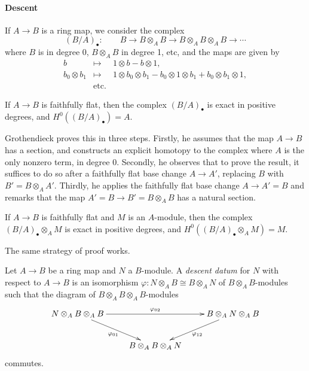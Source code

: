 \paragraph{Descent}
If $A \to B$ is a ring map, we consider the complex
$$
(B/A)_\bullet : \qquad B \to B\otimes_A B \to B\otimes_A B \otimes_A B \to \cdots
$$
where $B$ is in degree 0, $B\otimes_A B$ in degree 1, etc, and the maps are given by 
\begin{eqnarray*}
b & \mapsto  & 1 \otimes b - b \otimes 1, \\
b_0 \otimes b_1 &  \mapsto & 1 \otimes b_0 \otimes b_1 - b_0 \otimes 1 \otimes b_1 + b_0 \otimes b_1 \otimes 1, \\
& \text{etc.}
\end{eqnarray*}

\begin{lemma}
If $A \to B$ is faithfully flat, then the complex $(B/A)_\bullet$ is exact in positive degrees, and $H^0((B/A)_\bullet) = A$.
\end{lemma}

Grothendieck proves this in three steps. Firstly, he assumes that the map $A \to B$ has a section, and constructs an explicit homotopy to the complex where $A$ is the only nonzero term, in degree 0. Secondly, he observes that to prove the result, it suffices to do so after a faithfully flat base change $A \to A'$,  replacing $B$ with $B' = B \otimes_A A'$. Thirdly, he applies the faithfully flat base change $A \to A' =B$ and remarks that the map $A' = B \to B' = B\otimes_A B$ has a natural section.

\begin{lemma} \label{lem:descentForModules}
If $A \to B$ is faithfully flat and $M$ is an $A$-module, then the
complex $(B/A)_\bullet \otimes_A M$ is exact in positive degrees, and $H^0((B/A)_\bullet \otimes_A M) = M$.
\end{lemma}

The same strategy of proof works.

\begin{definition}
Let $A \to B$ be a ring map and $N$ a $B$-module. A \emph{descent datum} for $N$ with respect to $A \to B$ is an isomorphism $\varphi: N\otimes_A B \cong B\otimes_A N$ of $B\otimes_A B$-modules such that the diagram of $B\otimes_A B \otimes_A B$-modules
$$
\xymatrix{
{N \otimes_A  B \otimes_A B} \ar_{\varphi_{01}}[dr] \ar^{\varphi_{02}}[rr] & & {B \otimes_A  N \otimes_A B}\ar^{\varphi_{12}}[dl] \\
& {B \otimes_A  B \otimes_A N}  
}
$$ 
commutes.
\end{definition}

